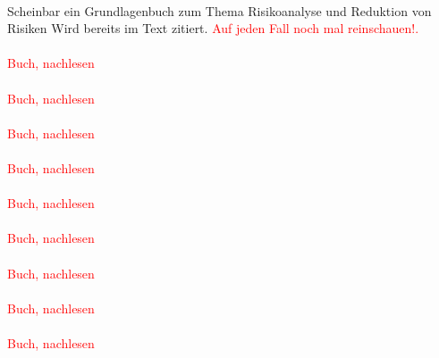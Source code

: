 \paragraph*{\cite{Ayyub_2014}}Scheinbar ein Grundlagenbuch zum Thema Risikoanalyse und Reduktion von Risiken \hfill \newline
Wird bereits im Text zitiert. \hfill \newline
\textcolor{red}{Auf jeden Fall noch mal reinschauen!.}

\paragraph*{\cite{ChemicalProcessSafety_2007a}} \textcolor{red}{Buch, nachlesen}
\paragraph*{\cite{ChemicalProcessSafety_2007}} \textcolor{red}{Buch, nachlesen}
\paragraph*{\cite{ChemicalProcessSafety_2008}} \textcolor{red}{Buch, nachlesen}
\paragraph*{\cite{ChemicalProcessSafety_2008a}} \textcolor{red}{Buch, nachlesen}
\paragraph*{\cite{ChemicalProcessSafety_2008b}} \textcolor{red}{Buch, nachlesen}
\paragraph*{\cite{ChemicalProcessSafety_2009}} \textcolor{red}{Buch, nachlesen}
\paragraph*{\cite{ChemicalProcessSafety_2009a}} \textcolor{red}{Buch, nachlesen}
\paragraph*{\cite{ChemicalProcessSafety_2010}} \textcolor{red}{Buch, nachlesen}
\paragraph*{\cite{ChemicalProcessSafety_2012}} \textcolor{red}{Buch, nachlesen}
